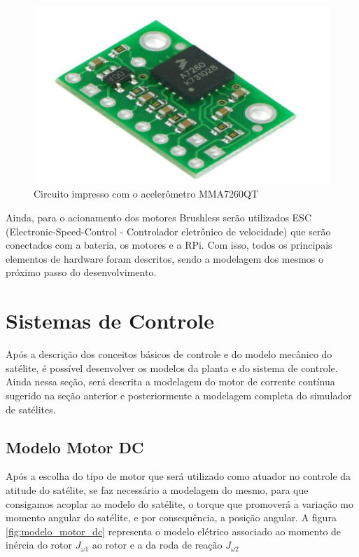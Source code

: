 \begin{figure}[H]
  \caption{Circuito impresso com o acelerômetro MMA7260QT}
  \begin{center}
      \includegraphics[scale=.4]{img/pci_acelerometro_calache_p22}
  \end{center}
  \label{fig:pci_acelerometro_calache_p22}
\end{figure}

Ainda, para o acionamento dos motores Brushless serão utilizados ESC (Electronic-Speed-Control - Controlador eletrônico de velocidade) que serão conectados com a bateria, os motores e a RPi. Com isso, todos os principais elementos de hardware foram descritos, sendo a modelagem dos mesmos o próximo passo do desenvolvimento.


\section{Sistemas de Controle}

Após a descrição dos conceitos básicos de controle e do modelo mecânico do satélite, é possível desenvolver os modelos da planta e do sistema de controle. Ainda nessa seção, será descrita a modelagem do motor de corrente contínua sugerido na seção anterior e posteriormente a modelagem completa do simulador de satélites.

\subsection{Modelo Motor DC}

Após a escolha do tipo de motor que será utilizado como atuador no controle da atitude do satélite, se faz necessário a modelagem do mesmo, para que consigamos acoplar ao modelo do satélite, o torque que promoverá a variação mo momento angular do satélite, e por consequência, a posição angular. A figura \ref{fig:modelo_motor_dc} representa o modelo elétrico associado ao momento de inércia do rotor $J_{\omega 1}$ ao rotor e a da roda de reação $J_{\omega 2}$

